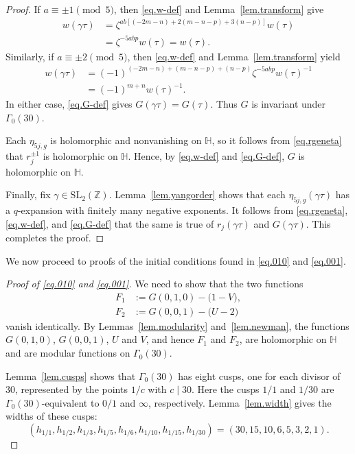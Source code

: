 \documentclass{amsart}
\theoremstyle{definition}
\begin{document}
{{\begin{proof}
If $a\equiv\pm1\pmod5$, then \eqref{eq.w-def} and Lemma~\ref{lem.transform} give
\begin{equation*}
\begin{aligned}
w(\gamma\tau)
&=\zeta^{ab\left[(-2m-n)+2(m-n-p)+3(n-p)\right]}w(\tau)\\
&=\zeta^{-5abp}w(\tau)
=w(\tau).
\end{aligned}
\end{equation*}
Similarly, if $a\equiv\pm2\pmod5$, then \eqref{eq.w-def} and
Lemma~\ref{lem.transform} yield
\begin{equation*}
\begin{aligned}
w(\gamma\tau)
&=(-1)^{(-2m-n)+(m-n-p)+(n-p)}
\zeta^{-5abp}w(\tau)^{-1}\\
&=(-1)^{m+n}w(\tau)^{-1}.
\end{aligned}
\end{equation*}
In either case, \eqref{eq.G-def} gives $G(\gamma\tau)=G(\tau)$.  Thus $G$ is
invariant under $\Gamma_{0}(30)$.

Each $\eta_{5j,g}$ is holomorphic and nonvanishing on
$\mathbb{H}$, so it follows from \eqref{eq.rgeneta} that
$r_{j}^{\pm1}$ is holomorphic on $\mathbb{H}$.  Hence, by \eqref{eq.w-def}
and \eqref{eq.G-def}, $G$ is holomorphic
on $\mathbb{H}$.

Finally, fix $\gamma\in\mathrm{SL}_{2}(\mathbb{Z})$.
Lemma~\ref{lem.yangorder} shows that each
$\eta_{5j,g}(\gamma\tau)$ has a $q$-expansion with finitely many negative exponents. It follows from
\eqref{eq.rgeneta}, \eqref{eq.w-def}, and \eqref{eq.G-def}
that the same is true of $r_j(\gamma\tau)$ and
$G(\gamma\tau)$. This completes
the proof.	
\end{proof}

{We now proceed to proofs of the initial conditions found in \eqref{eq.010} and \eqref{eq.001}.} 

\begin{proof}[Proof of \eqref{eq.010} and \eqref{eq.001}]
We need to show that
the two functions
\begin{align}
F_{1}&:=G(0,1,0)-\bigl(1-V\bigr),
\label{eq.F1}\\
F_{2}&:=G(0,0,1)-\bigl(U-2\bigr)
\label{eq.F2}
\end{align}
vanish identically. By Lemmas~\ref{lem.modularity} and~\ref{lem.newman}, the functions
$G(0,1,0)$, $G(0,0,1)$, $U$ and $V$, and hence $F_{1}$ and
$F_{2}$, are holomorphic on $\mathbb{H}$ and are modular functions on
$\Gamma_{0}(30)$. 

Lemma~\ref{lem.cusps} shows that $\Gamma_{0}(30)$ has eight
cusps, one for each divisor of $30$, represented by the points
$1/c$ with $c\mid30$. Here the cusps $1/1$ and $1/30$ are $\Gamma_{0}(30)$-equivalent to $0/1$ and
$\infty$, respectively. Lemma~\ref{lem.width} gives the widths of these cusps:
\begin{equation}
(h_{1/1},h_{1/2},h_{1/3},h_{1/5},h_{1/6},h_{1/10},h_{1/15},h_{1/30})
=(30,15,10,6,5,3,2,1).
\label{eq.widths}
\end{equation}


\end{proof}}}
\end{document}
